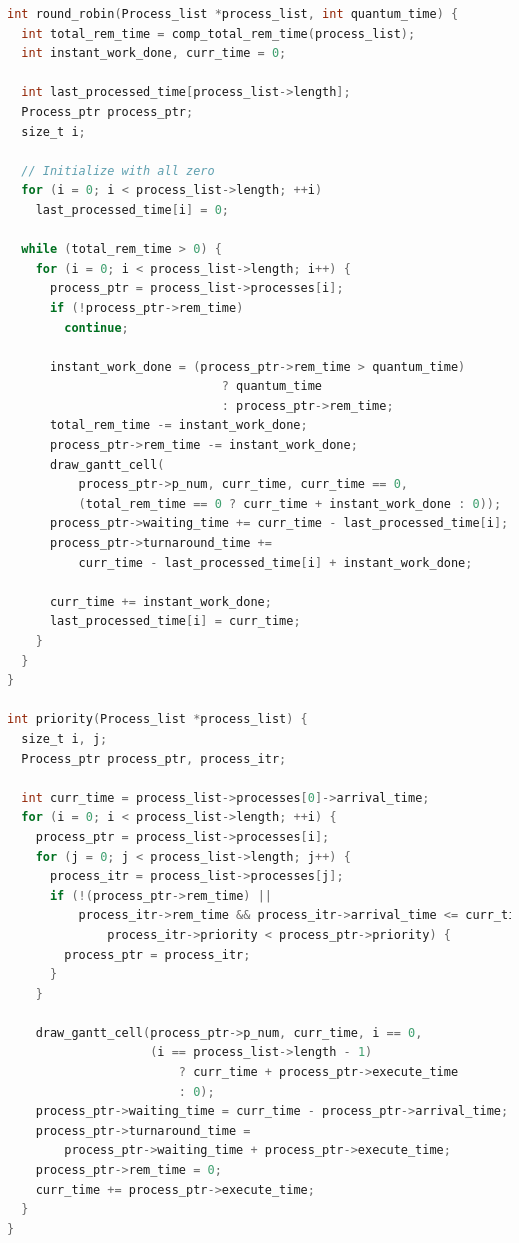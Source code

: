 \documentclass[13pt,oneside]{book}
\begin{document}
\begin{lstlisting}[language=C]
int round_robin(Process_list *process_list, int quantum_time) {
  int total_rem_time = comp_total_rem_time(process_list);
  int instant_work_done, curr_time = 0;

  int last_processed_time[process_list->length];
  Process_ptr process_ptr;
  size_t i;

  // Initialize with all zero
  for (i = 0; i < process_list->length; ++i)
    last_processed_time[i] = 0;

  while (total_rem_time > 0) {
    for (i = 0; i < process_list->length; i++) {
      process_ptr = process_list->processes[i];
      if (!process_ptr->rem_time)
        continue;

      instant_work_done = (process_ptr->rem_time > quantum_time)
                              ? quantum_time
                              : process_ptr->rem_time;
      total_rem_time -= instant_work_done;
      process_ptr->rem_time -= instant_work_done;
      draw_gantt_cell(
          process_ptr->p_num, curr_time, curr_time == 0,
          (total_rem_time == 0 ? curr_time + instant_work_done : 0));
      process_ptr->waiting_time += curr_time - last_processed_time[i];
      process_ptr->turnaround_time +=
          curr_time - last_processed_time[i] + instant_work_done;

      curr_time += instant_work_done;
      last_processed_time[i] = curr_time;
    }
  }
}

int priority(Process_list *process_list) {
  size_t i, j;
  Process_ptr process_ptr, process_itr;

  int curr_time = process_list->processes[0]->arrival_time;
  for (i = 0; i < process_list->length; ++i) {
    process_ptr = process_list->processes[i];  
    for (j = 0; j < process_list->length; j++) {
      process_itr = process_list->processes[j];
      if (!(process_ptr->rem_time) ||
          process_itr->rem_time && process_itr->arrival_time <= curr_time &&
              process_itr->priority < process_ptr->priority) {
        process_ptr = process_itr;
      }
    }

    draw_gantt_cell(process_ptr->p_num, curr_time, i == 0,
                    (i == process_list->length - 1)
                        ? curr_time + process_ptr->execute_time
                        : 0);
    process_ptr->waiting_time = curr_time - process_ptr->arrival_time;
    process_ptr->turnaround_time =
        process_ptr->waiting_time + process_ptr->execute_time;
    process_ptr->rem_time = 0;
    curr_time += process_ptr->execute_time;
  }
}
\end{lstlisting}
\end{document}
